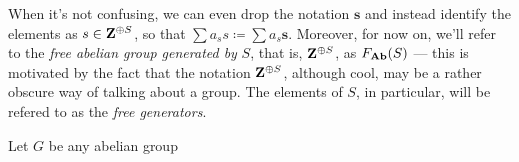 \begin{notation}
When it's not confusing, we can even drop the notation \(\mathbf{s}\) and
instead identify the elements as \(s \in \mathbf{Z}^{\oplus S}\), so that \(\sum a_s s
\coloneq \sum a_s \mathbf{s}\). Moreover, for now on, we'll refer to the
\emph{free abelian group generated by} \(S\), that is, \(\mathbf{Z}^{\oplus S}\), as
\(F_{{\textbf{Ab}}}(S)\) --- this is motivated by the fact that the notation \(\mathbf{Z}^{\oplus
S}\), although cool, may be a rather obscure way of talking about a group. The
elements of \(S\), in particular, will be refered to as the \emph{free
generators}.
\end{notation}

\begin{proposition}
\label{prop:Ab-isomorphic-factor-of-free}
Let \(G\) be any abelian group
\end{proposition}



